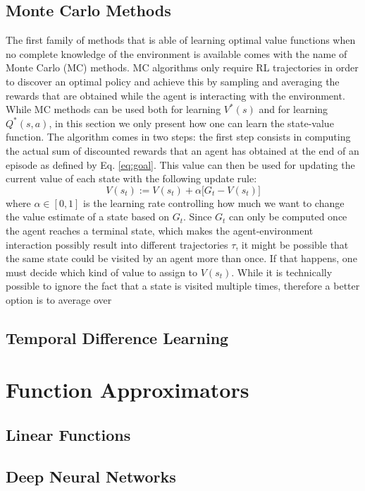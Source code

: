 \subsection{Monte Carlo Methods}
The first family of methods that is able of learning optimal value functions when no complete knowledge of the environment is available comes with the name of Monte Carlo (MC) methods. MC algorithms only require RL trajectories in order to discover an optimal policy and achieve this by sampling and averaging the rewards that are obtained while the agent is interacting with the environment. While MC methods can be used both for learning $V^{*}(s)$ and for learning $Q^{*}(s,a)$, in this section we only present how one can learn the state-value function. The algorithm comes in two steps: the first step consists in computing the actual sum of discounted rewards that an agent has obtained at the end of an episode as defined by Eq. \ref{eq:goal}. This value can then be used for updating the current value of each state with the following update rule: 
\begin{equation}
	V(s_t) := V(s_t) + \alpha \big[G_t - V(s_t) \big]
\end{equation}
where $\alpha \in [0,1]$ is the learning rate controlling how much we want to change the value estimate of a state based on $G_t$. Since $G_t$ can only be computed once the agent reaches a terminal state, which makes the agent-environment interaction possibly result into different trajectories $\tau$, it might be possible that the same state could be visited by an agent more than once. If that happens, one must decide which kind of value to assign to $V(s_t)$. While it is technically possible to ignore the fact that a state is visited multiple times, therefore  
a better option is to average over   

\subsection{Temporal Difference Learning}

\section{Function Approximators}
\subsection{Linear Functions}

\subsection{Deep Neural Networks}

\section{}

